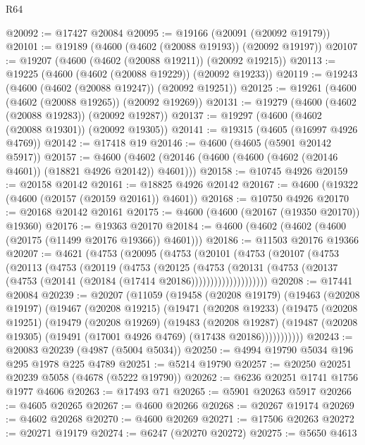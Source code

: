 \begin{lexlean}{R64}
\begin{coremodule}
@20092 := @17427 @20084
@20095 := @19166 (@20091 (@20092 @19179))
@20101 := @19189 (@4600 (@4602 (@20088 @19193)) (@20092 @19197))
@20107 := @19207 (@4600 (@4602 (@20088 @19211)) (@20092 @19215))
@20113 := @19225 (@4600 (@4602 (@20088 @19229)) (@20092 @19233))
@20119 := @19243 (@4600 (@4602 (@20088 @19247)) (@20092 @19251))
@20125 := @19261 (@4600 (@4602 (@20088 @19265)) (@20092 @19269))
@20131 := @19279 (@4600 (@4602 (@20088 @19283)) (@20092 @19287))
@20137 := @19297 (@4600 (@4602 (@20088 @19301)) (@20092 @19305))
@20141 := @19315 (@4605 (@16997 @4926 @4769))
@20142 := @17418 @19
@20146 := @4600 (@4605 (@5901 @20142 @5917))
@20157 := @4600 (@4602 (@20146 (@4600 (@4600 (@4602 (@20146 @4601)) (@18821 @4926 @20142)) @4601)))
@20158 := @10745 @4926
@20159 := @20158 @20142
@20161 := @18825 @4926 @20142
@20167 := @4600 (@19322 (@4600 (@20157 (@20159 @20161)) @4601))
@20168 := @10750 @4926
@20170 := @20168 @20142 @20161
@20175 := @4600 (@4600 (@20167 (@19350 @20170)) @19360)
@20176 := @19363 @20170
@20184 := @4600 (@4602 (@4602 (@4600 (@20175 (@11499 @20176 @19366)) @4601)))
@20186 := @11503 @20176 @19366
@20207 := @4621
    (@4753
      (@20095
        (@4753
          (@20101
            (@4753
              (@20107
                (@4753
                  (@20113
                    (@4753
                      (@20119
                        (@4753
                          (@20125
                            (@4753
                              (@20131
                                (@4753
                                  (@20137 (@4753 (@20141 (@20184 (@17414 @20186))))))))))))))))))))
@20208 := @17441 @20084
@20239 := @20207
    (@11059
      (@19458
        (@20208 @19179)
        (@19463
          (@20208 @19197)
          (@19467
            (@20208 @19215)
            (@19471
              (@20208 @19233)
              (@19475
                (@20208 @19251)
                (@19479
                  (@20208 @19269)
                  (@19483
                    (@20208 @19287)
                    (@19487 (@20208 @19305) (@19491 (@17001 @4926 @4769) (@17438 @20186)))))))))))
@20243 := @20083 @20239 (@4987 (@5004 @5034))
@20250 := @4994 @19790 @5034 @196 @295 @1978 @225 @4789
@20251 := @5214 @19790
@20257 := @20250 @20251 @20239 @5058 (@4678 (@5222 @19790))
@20262 := @6236 @20251 @1741 @1756 @1977 @4606
@20263 := @17493 @71
@20265 := @5901 @20263 @5917
@20266 := @4605 @20265
@20267 := @4600 @20266
@20268 := @20267 @19174
@20269 := @4602 @20268
@20270 := @4600 @20269
@20271 := @17506 @20263
@20272 := @20271 @19179
@20274 := @6247 (@20270 @20272)
@20275 := @5650 @4613

\end{coremodule}
\end{lexlean}
